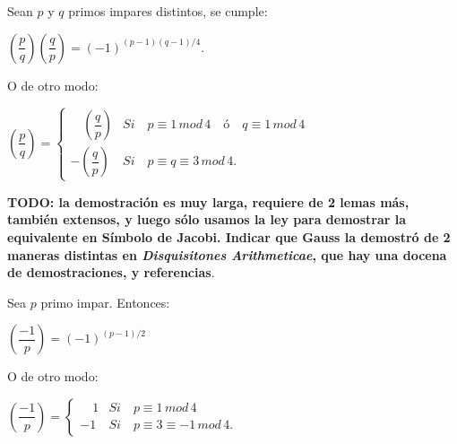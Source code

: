 \begin{theorem}
	Sean $p$ y $q$ primos impares distintos, se cumple:
	
	\begin{center}
		$
	\left( \dfrac{p}{q} \right) 	\left( \dfrac{q}{p} \right) = \left( -1 \right) ^{(p-1)(q-1)/4}
	$.
	\end{center}
	O de otro modo:
	
	\begin{center}
		$
		\left({\dfrac p q}\right) = \begin{cases}
		\quad \left({\dfrac q p}\right) & Si\quad p \equiv 1 \, mod \, 4 \quad  ó \quad  q \equiv 1 \, mod \, 4 \\
		-\left({\dfrac q p}\right) & Si\quad p \equiv q \equiv 3 \, mod \, 4.
		\end{cases}
		$
	\end{center}
	
	\label{quadRec:theo}
	
	
\end{theorem}

\textbf{TODO: la demostración es muy larga, requiere de 2 lemas más, también extensos, y luego sólo usamos la ley para demostrar la equivalente en Símbolo de Jacobi. Indicar que Gauss la demostró de 2 maneras distintas en \textit{Disquisitones Arithmeticae}, que hay una docena de demostraciones, y referencias}.


\begin{proposition}
	Sea $p$ primo impar. Entonces:
	
	\begin{center}
		$
			\left( \dfrac{-1}{p}\right) = (-1)^{(p-1)/2}
		$
	\end{center}
	
	
	O de otro modo:
	
	\begin{center}
		$
		\left(\dfrac{-1}{p}\right) = \begin{cases}
		\quad 1 & Si\quad p \equiv 1 \, mod \, 4 \\
		-1 & Si\quad p \equiv 3 \equiv -1 \, mod \, 4.
		\end{cases}
		$
	\end{center}
	
\end{proposition}

